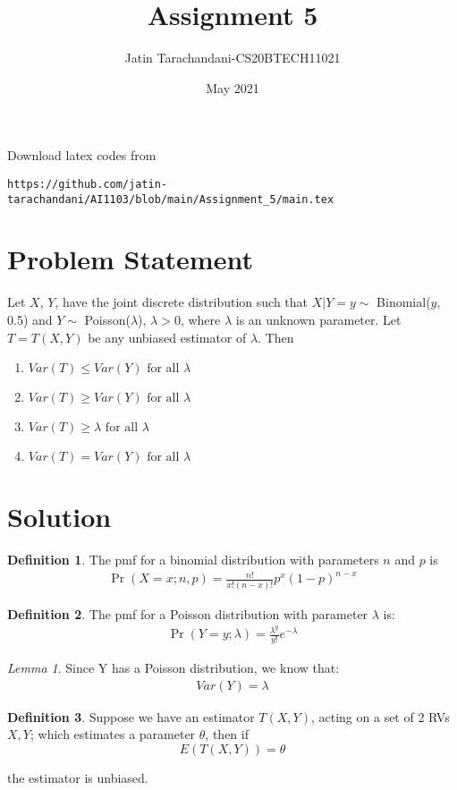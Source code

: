 \documentclass[twocolumn]{article}
\title{Assignment 5}
\author{Jatin Tarachandani-CS20BTECH11021}
\date{May 2021}
\providecommand{\pr}[1]{\ensuremath{\Pr\left(#1\right)}}
\providecommand{\brak}[1]{\ensuremath{\left(#1\right)}}
\theoremstyle{remark}
\newtheorem{lemma}[theorem]{Lemma}
\theoremstyle{definition}
\newtheorem{definition}{Definition}[section]
\numberwithin{equation}{subsection}
\begin{document}
\maketitle
Download latex codes from 
%
\begin{lstlisting}
https://github.com/jatin-tarachandani/AI1103/blob/main/Assignment_5/main.tex
\end{lstlisting}
\section{Problem Statement}
Let $X$, $Y$, have the joint discrete distribution such that $X|Y=y \sim$ Binomial($y$, 0.5) and $Y\sim$ Poisson($\lambda$), $\lambda>0$, where $\lambda$ is an unknown parameter. Let $T=T(X, Y)$ be any unbiased estimator of $\lambda$. Then
\begin{enumerate}
    \item  $Var(T) \leq Var(Y)  \text{ for all } \lambda$
    \item $Var(T) \geq Var(Y) \text{ for all } \lambda$
    \item $Var(T) \geq \lambda \text{ for all } \lambda$
    \item $Var(T) = Var(Y) \text{ for all } \lambda$
\end{enumerate}

\section{Solution}
\begin{definition}
The pmf for a binomial distribution with parameters $n$ and $p$ is
\begin{align}
    \pr{X=x;n, p}=\frac{n!}{x!\brak{n-x}!}p^{x}\brak{1-p}^{n-x}
\end{align}
\end{definition}
\begin{definition}
The pmf for a Poisson distribution with parameter $\lambda$ is:
\begin{align}
    \pr{Y=y; \lambda}=\frac{\lambda^y}{y!} e^{-\lambda}
\end{align}
\end{definition}
\begin{lemma}
Since Y has a Poisson distribution, we know that:
\begin{align}\label{Var=lam}
Var(Y)=\lambda
\end{align}
\end{lemma}
\begin{definition}
Suppose we have an estimator $T(X, Y)$, acting on a set of 2 RVs $X, Y$; which estimates a parameter $\theta$, then if
\begin{equation}
    E\brak{T(X, Y)}=\theta
\end{equation}

the estimator is unbiased. 
\end{definition}
\end{document}
